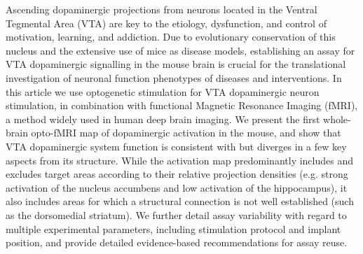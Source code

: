 Ascending dopaminergic projections from neurons located in the Ventral Tegmental Area (VTA) are key to the etiology, dysfunction, and control of motivation, learning, and addiction.
Due to evolutionary conservation of this nucleus and the extensive use of mice as disease models, establishing an assay for VTA dopaminergic signalling in the mouse brain is crucial for the translational investigation of neuronal function phenotypes of diseases and interventions.
In this article we use optogenetic stimulation for VTA dopaminergic neuron stimulation, in combination with functional Magnetic Resonance Imaging (fMRI), a method widely used in human deep brain imaging.
We present the first whole-brain opto-fMRI map of dopaminergic activation in the mouse, and show that VTA dopaminergic system function is consistent with but diverges in a few key aspects from its structure.
While the activation map predominantly includes and excludes target areas according to their relative projection densities (e.g. strong activation of the nucleus accumbens and low activation of the hippocampus), it also includes areas for which a structural connection is not well established (such as the dorsomedial striatum).
We further detail assay variability with regard to multiple experimental parameters, including stimulation protocol and implant position, and provide detailed evidence-based recommendations for assay reuse.
